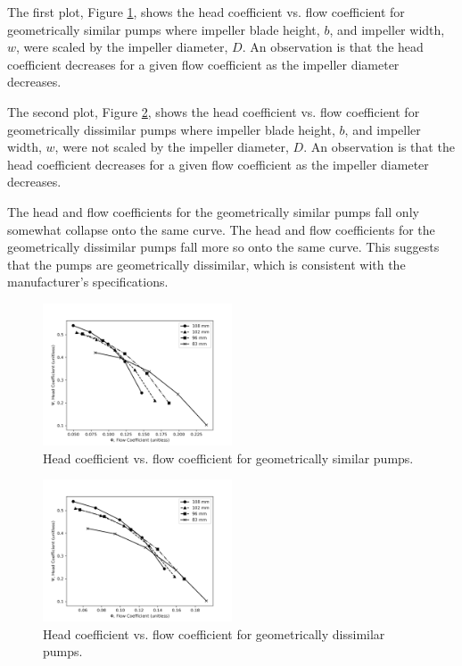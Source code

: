 The first plot, Figure \ref{fig:geometric_similarity_head_coefficient}, shows the head coefficient vs. flow coefficient for geometrically similar pumps where impeller blade height, $b$, and impeller width, $w$, were scaled by the impeller diameter, $D$. An observation is that the head coefficient decreases for a given flow coefficient as the impeller diameter decreases.  

The second plot, Figure \ref{fig:geometric_dissimilarity_head_coefficient}, shows the head coefficient vs. flow coefficient for geometrically dissimilar pumps where impeller blade height, $b$, and impeller width, $w$, were not scaled by the impeller diameter, $D$. An observation is that the head coefficient decreases for a given flow coefficient as the impeller diameter decreases. 

The head and flow coefficients for the geometrically similar pumps fall only somewhat collapse onto the same curve. The head and flow coefficients for the geometrically dissimilar pumps fall more so onto the same curve. This suggests that the pumps are geometrically dissimilar, which is consistent with the manufacturer's specifications.
\begin{figure}[H]
    \centering
    \includegraphics[width=0.5\textwidth]{Sections/Figures/Geometrically Similar Pump Coefficients Plot.png}
    \caption{Head coefficient vs. flow coefficient for geometrically similar pumps.}
    \label{fig:geometric_similarity_head_coefficient}
\end{figure}
\begin{figure}[H]
    \centering
    \includegraphics[width=0.5\textwidth]{Sections/Figures/Geometrically Dissimilar Pump Coefficients Plot.png}
    \caption{Head coefficient vs. flow coefficient for geometrically dissimilar pumps.}
    \label{fig:geometric_dissimilarity_head_coefficient}
\end{figure}

